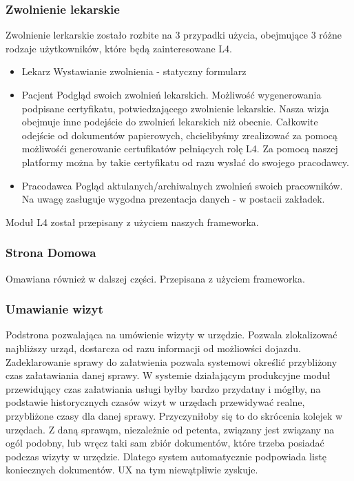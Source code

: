 \documentclass[licencjacka]{pracamgr}
\begin{document}
\subsubsection{Zwolnienie lekarskie}
Zwolnienie lerkarskie zostało rozbite na 3 przypadki użycia, obejmujące 3 różne rodzaje użytkowników, które
będą zainteresowane L4.
\begin{itemize}

  \item Lekarz \newline
    Wystawianie zwolnienia - statyczny formularz
  \item Pacjent \newline
    Podgląd swoich zwolnień lekarskich. Możliwość wygenerowania podpisane certyfikatu, potwiedzającego
    zwolnienie lekarskie. Nasza wizja obejmuje inne podejście do zwolnień lekarskich niż obecnie.
    Całkowite odejście od dokumentów papierowych, chcielibyśmy zrealizować za pomocą możliwośći
    generowanie certufikatów pełniących rolę L4. Za pomocą naszej platformy można by takie certyfikatu
    od razu wysłać do swojego pracodawcy.
  \item Pracodawca
    Pogląd aktulanych/archiwalnych zwolnień swoich pracowników. Na uwagę zasługuje wygodna prezentacja danych -
    w postacii zakładek.
\end{itemize}
Moduł L4 został przepisany z użyciem naszych frameworka.
\subsubsection{Strona Domowa}
Omawiana również w dalszej części. Przepisana z użyciem frameworka.

\subsubsection{Umawianie wizyt}
Podstrona pozwalająca na umówienie wizyty w urzędzie. Pozwala zlokalizować najbliższy urząd,
dostarcza od razu informacji od możliowści dojazdu. Zadeklarowanie sprawy do załatwienia pozwala
systemowi określić przybliżony czas załatawiania danej sprawy. W systemie działającym produkcyjne
moduł przewidujący czas załatwiania usługi byłby bardzo przydatny i mógłby, na podstawie historycznych czasów
wizyt w urzędach przewidywać realne, przybliżone czasy dla danej sprawy. Przyczyniłoby się to
do skrócenia kolejek w urzędach. Z daną sprawąm, niezależnie od petenta, związany jest związany na ogól podobny,
lub wręcz taki sam zbiór dokumentów, które trzeba posiadać podczas wizyty w urzędzie. Dlatego system automatycznie
podpowiada listę koniecznych dokumentów. UX na tym niewątpliwie zyskuje.
\end{document}
